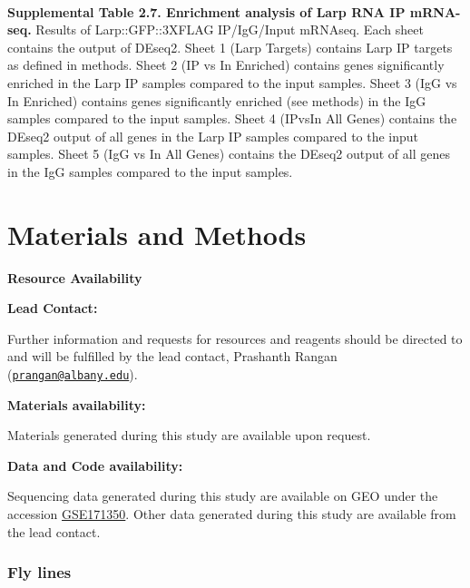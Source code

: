 \documentclass[12pt,oneside]{reedthesis}
\begin{document}
\textbf{\\
}

\textbf{Supplemental Table 2.7. Enrichment analysis of Larp RNA IP mRNA-seq.}
Results of Larp::GFP::3XFLAG IP/IgG/Input mRNAseq. Each sheet contains the output of DEseq2. Sheet 1 (Larp Targets) contains Larp IP targets as defined in methods. Sheet 2 (IP vs In Enriched) contains genes significantly enriched in the Larp IP samples compared to the input samples. Sheet 3 (IgG vs In Enriched) contains genes significantly enriched (see methods) in the IgG samples compared to the input samples. Sheet 4 (IPvsIn All Genes) contains the DEseq2 output of all genes in the Larp IP samples compared to the input samples. Sheet 5 (IgG vs In All Genes) contains the DEseq2 output of all genes in the IgG samples compared to the input samples.

\hypertarget{materials-and-methods}{%
\section{Materials and Methods}\label{materials-and-methods}}

\textbf{Resource Availability}

\textbf{Lead Contact:}

Further information and requests for resources and reagents should be directed to and will be fulfilled by the lead contact, Prashanth Rangan (\href{mailto:prangan@albany.edu}{\nolinkurl{prangan@albany.edu}}).

\textbf{Materials availability:}

Materials generated during this study are available upon request.

\textbf{Data and Code availability:}

Sequencing data generated during this study are available on GEO under the accession \href{https://www.ncbi.nlm.nih.gov/geo/query/acc.cgi?acc=GSE171350}{GSE171350}. Other data generated during this study are available from the lead contact.

\hypertarget{fly-lines}{%
\subsubsection{Fly lines}\label{fly-lines}}
\end{document}
